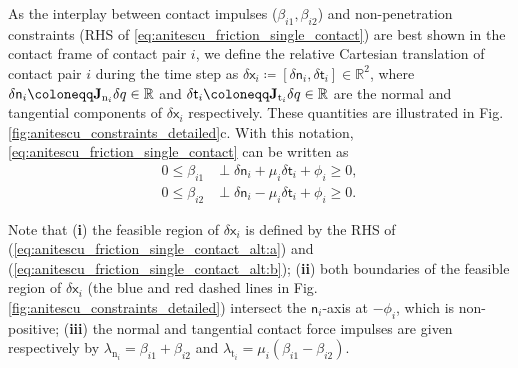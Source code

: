 As the interplay between contact impulses ($\beta_{i1}, \beta_{i2}$) and non-penetration constraints (RHS of \eqref{eq:anitescu_friction_single_contact}) are best shown in the contact frame of contact pair $i$, we define the relative Cartesian translation of contact pair $i$ during the time step as $\delta \mathsf{x}_i \coloneqq [\delta \mathsf{n}_i, \delta \mathsf{t}_i] \in \mathbb{R}^2$, where $\delta \mathsf{n}_i \coloneqq \Jn[i] \dq \in \mathbb{R}$ and $\delta \mathsf{t}_i \coloneqq \Jt[i] \dq \in \mathbb{R}$ are the normal and tangential components of $\delta \mathsf{x}_i$ respectively. These quantities are illustrated in Fig. \ref{fig:anitescu_constraints_detailed}c. With this notation, \eqref{eq:anitescu_friction_single_contact} can be written as
\begin{subequations}
\label{eq:anitescu_friction_single_contact_alt}
\begin{align}
0 \leq \beta_{i1} &\perp \delta \mathsf{n}_i + \mu_i \delta \mathsf{t}_i + \phi_i  \geq 0, \label{eq:anitescu_friction_single_contact_alt:a}\\
0 \leq \beta_{i2} &\perp  \delta \mathsf{n}_i - \mu_i \delta \mathsf{t}_i + \phi_i \geq 0. \label{eq:anitescu_friction_single_contact_alt:b}
\end{align}
\end{subequations}


Note that (\textbf{i}) the feasible region of $\delta \mathsf{x}_i$ is defined by the RHS of (\ref{eq:anitescu_friction_single_contact_alt:a}) and (\ref{eq:anitescu_friction_single_contact_alt:b}); (\textbf{ii}) both boundaries of the feasible region of $\delta \mathsf{x}_i$ (the blue and red dashed lines in Fig. \ref{fig:anitescu_constraints_detailed}) intersect the $\mathsf{n}_i$-axis at $-\phi_i$, which is non-positive; (\textbf{iii}) the normal and tangential contact force impulses are given respectively by $\lambda_{\mathrm{n}_i} = \beta_{i1} + \beta_{i2}$ and $\lambda_{\mathrm{t}_{i}} = \mu_i \left( \beta_{i1} - \beta_{i2}\right)$.

